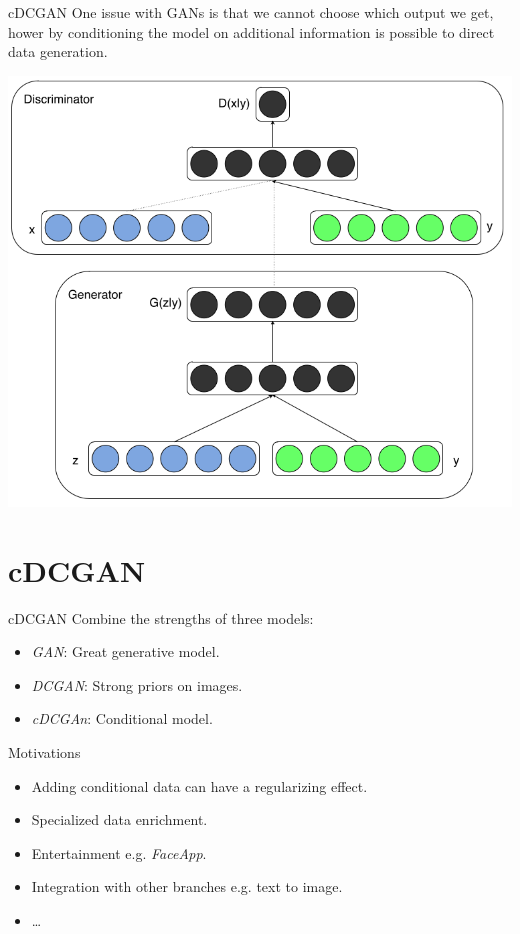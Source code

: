 \documentclass{beamer}
\begin{document}
\begin{frame}{cDCGAN}
    One issue with GANs is that we cannot choose which output we get, hower by conditioning the model on additional information is possible to direct data generation.
\end{frame}

\begin{frame}
    \centering
    \includegraphics[scale=0.35]{images/cgan-scheme.png}
\end{frame}

\section{cDCGAN}
\begin{frame}{cDCGAN}
    Combine the strengths of three models:
    \begin{itemize}
        \item \textit{GAN}: Great generative model.
        \item \textit{DCGAN}: Strong priors on images.
        \item \textit{cDCGAn}: Conditional model.
    \end{itemize}
\end{frame}

\begin{frame}{Motivations}
    \begin{itemize}
        \item Adding conditional data can have a regularizing effect.
        \item Specialized data enrichment.
        \item Entertainment e.g. \textit{FaceApp}.
        \item Integration with other branches e.g. text to image.
        \item \dots
    \end{itemize}
\end{frame}
\end{document}
